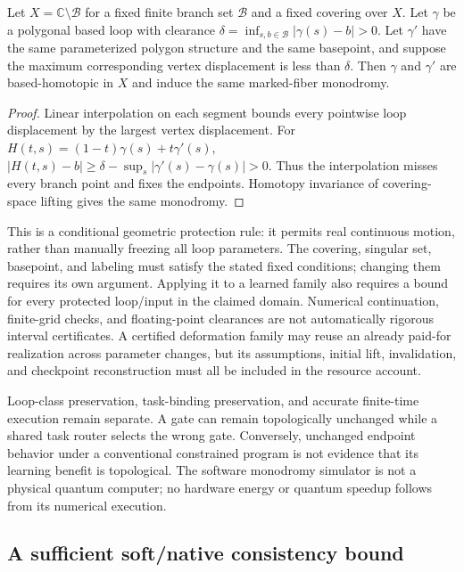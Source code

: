 \begin{proposition}
Let $X=\mathbb C\setminus\mathcal B$ for a fixed finite branch set
$\mathcal B$ and a fixed covering over $X$. Let $\gamma$ be a polygonal based
loop with clearance
$\delta=\inf_{s,b\in\mathcal B}|\gamma(s)-b|>0$.
Let $\gamma'$ have the same parameterized polygon structure and the same
basepoint, and suppose the maximum corresponding vertex displacement is less
than $\delta$. Then $\gamma$ and $\gamma'$ are based-homotopic in $X$ and
induce the same marked-fiber monodromy.
\end{proposition}
\begin{proof}
Linear interpolation on each segment bounds every pointwise loop displacement
by the largest vertex displacement. For
$H(t,s)=(1-t)\gamma(s)+t\gamma'(s)$,
$|H(t,s)-b|\geq\delta-\sup_s|\gamma'(s)-\gamma(s)|>0$.
Thus the interpolation misses every branch point and fixes the endpoints.
Homotopy invariance of covering-space lifting gives the same monodromy.
\end{proof}

This is a conditional geometric protection rule: it permits real continuous
motion, rather than manually freezing all loop parameters. The covering,
singular set, basepoint, and labeling must satisfy the stated fixed conditions;
changing them requires its own argument. Applying it to a learned family also
requires a bound for every protected loop/input in the claimed domain.
Numerical continuation, finite-grid checks, and floating-point clearances are
not automatically rigorous interval certificates. A certified deformation
family may reuse an already paid-for realization across parameter changes, but
its assumptions, initial lift, invalidation, and checkpoint reconstruction must
all be included in the resource account.

Loop-class preservation, task-binding preservation, and accurate finite-time
execution remain separate. A gate can remain topologically unchanged while a
shared task router selects the wrong gate. Conversely, unchanged endpoint
behavior under a conventional constrained program is not evidence that its
learning benefit is topological. The software monodromy simulator is not a
physical quantum computer; no hardware energy or quantum speedup follows from
its numerical execution.

\subsection{A sufficient soft/native consistency bound}

